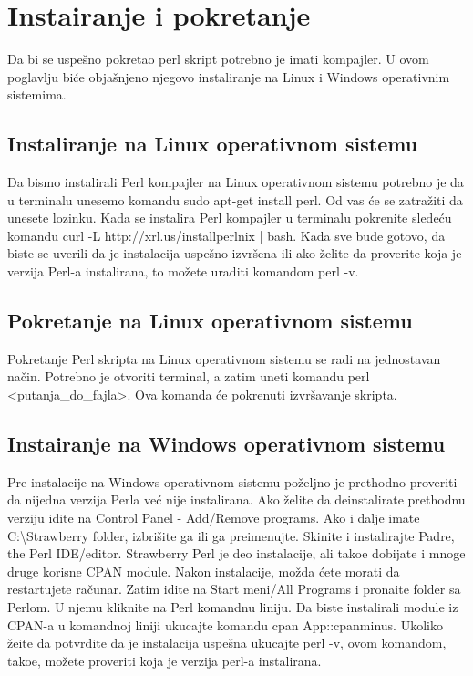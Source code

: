 \documentclass[a4paper]{article}
\begin{document}
\section{Instairanje i pokretanje}
Da bi se uspe\v sno pokretao perl skript potrebno je imati kompajler. U ovom poglavlju bi\'ce obja\v snjeno njegovo instaliranje na Linux i Windows operativnim sistemima.

\subsection{Instaliranje na Linux operativnom sistemu}
Da bismo instalirali Perl kompajler na Linux operativnom sistemu potrebno je da u terminalu unesemo komandu sudo apt-get install perl. Od vas \'ce se zatra\v ziti da unesete lozinku. Kada se instalira Perl kompajler u terminalu pokrenite slede\'cu komandu curl -L http://xrl.us/installperlnix | bash. Kada sve bude gotovo, da biste se uverili da je instalacija uspe\v sno izvr\v sena ili ako \v zelite da proverite koja je verzija Perl-a instalirana, to mo\v zete uraditi komandom perl -v.

\subsection{Pokretanje na Linux operativnom sistemu}
Pokretanje Perl skripta na Linux operativnom sistemu se radi na jednostavan na\v cin. Potrebno je otvoriti terminal, a zatim uneti komandu perl <putanja\_do\_fajla>. Ova komanda \'ce pokrenuti izvr\v savanje skripta.

\subsection{Instairanje na Windows operativnom sistemu}
Pre instalacije na Windows operativnom sistemu po\v zeljno je  prethodno proveriti da nijedna verzija Perla ve\'c nije instalirana. Ako \v zelite da deinstalirate prethodnu verziju idite na Control Panel - Add/Remove programs. Ako i dalje imate C:\textbackslash Strawberry folder, izbri\v site ga ili ga preimenujte. Skinite i instalirajte Padre, the Perl IDE/editor. Strawberry Perl je deo instalacije, ali tako\dj{}e dobijate i mnoge druge korisne CPAN module. Nakon instalacije, mo\v zda \'cete morati da restartujete ra\v cunar. Zatim idite na Start meni/All Programs i prona\dj{}ite folder sa Perlom. U njemu kliknite na Perl komandnu liniju.  Da biste instalirali module iz CPAN-a u komandnoj liniji ukucajte komandu cpan App::cpanminus. Ukoliko \v zeite da  potvrdite da je instalacija uspe\v sna ukucajte perl -v, ovom komandom, tako\dj{}e, mo\v zete proveriti koja je verzija perl-a instalirana.
\end{document}
